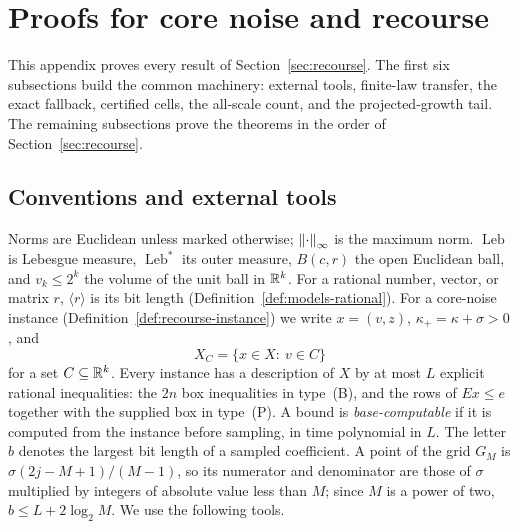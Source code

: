 \section{Proofs for core noise and recourse}
\label{app:recourse}

This appendix proves every result of Section~\ref{sec:recourse}. The
first six subsections build the common machinery: external tools,
finite-law transfer, the exact fallback, certified cells, the all-scale
count, and the projected-growth tail. The remaining subsections prove
the theorems in the order of Section~\ref{sec:recourse}.

\subsection{Conventions and external tools}
\label{app:recourse-tools}

Norms are Euclidean unless marked otherwise; $\left\lVert\cdot\right\rVert_\infty$ is
the maximum norm. $\operatorname{Leb}$ is Lebesgue measure,
$\operatorname{Leb}^*$ its outer measure, $B(c,r)$ the open Euclidean
ball, and $v_k\le2^k$ the volume of the unit ball in $\mathbb R^k$. For a
rational number, vector, or matrix $r$, $\langle r\rangle$ is its bit
length (Definition~\ref{def:models-rational}). For a
core-noise instance (Definition~\ref{def:recourse-instance}) we write
$x=(v,z)$, $\kappa_+=\kappa+\sigma>0$, and
\[
 X_C=\{x\in X:\ v\in C\}
\]
for a set $C\subseteq\mathbb R^k$. Every instance has a description of $X$ by
at most $L$ explicit rational inequalities: the $2n$ box inequalities in
type~(B), and the rows of $Ex\le e$ together with the supplied box in
type~(P). A bound is \emph{base-computable} if it is computed from the
instance before sampling, in time polynomial in $L$. The letter $b$
denotes the largest bit length of a sampled coefficient. A point of
the grid $G_M$ is $\sigma(2j-M+1)/(M-1)$, so its numerator and
denominator are those of $\sigma$ multiplied by integers of absolute
value less than $M$; since $M$ is a power of two, $b\le L+2\log_2M$. We
use the following tools.


